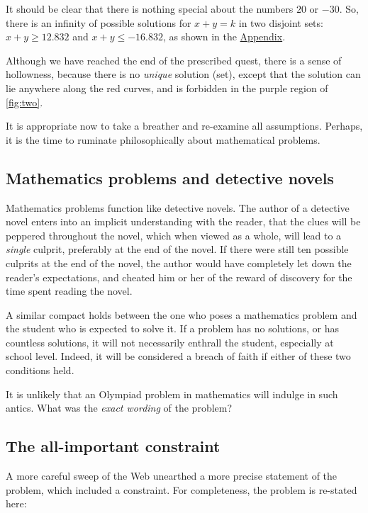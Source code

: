 \documentclass[
  a4paper,
]{article}
\begin{document}
It should be clear that there is nothing special about the numbers
\(20\) or \(-30\). So, there is an infinity of possible solutions for
\(x + y = k\) in two disjoint sets: \(x + y \geq 12.832\) and
\(x + y \leq -16.832\), as shown in the \hyperref[appendix]{Appendix}.

Although we have reached the end of the prescribed quest, there is a
sense of hollowness, because there is no \emph{unique} solution (set),
except that the solution can lie anywhere along the red curves, and is
forbidden in the purple region of \cref{fig:two}.

It is appropriate now to take a breather and re-examine all assumptions.
Perhaps, it is the time to ruminate philosophically about mathematical
problems.

\subsection{Mathematics problems and detective
novels}\label{mathematics-problems-and-detective-novels}

Mathematics problems function like detective novels. The author of a
detective novel enters into an implicit understanding with the reader,
that the clues will be peppered throughout the novel, which when viewed
as a whole, will lead to a \emph{single} culprit, preferably at the end
of the novel. If there were still ten possible culprits at the end of
the novel, the author would have completely let down the reader's
expectations, and cheated him or her of the reward of discovery for the
time spent reading the novel.

A similar compact holds between the one who poses a mathematics problem
and the student who is expected to solve it. If a problem has no
solutions, or has countless solutions, it will not necessarily enthrall
the student, especially at school level. Indeed, it will be considered a
breach of faith if either of these two conditions held.

It is unlikely that an Olympiad problem in mathematics will indulge in
such antics. What was the \emph{exact wording} of the problem?

\subsection{The all-important
constraint}\label{the-all-important-constraint}

A more careful sweep of the Web unearthed a more precise statement of
the problem, which included a constraint. For completeness, the problem
is re-stated here:
\end{document}
